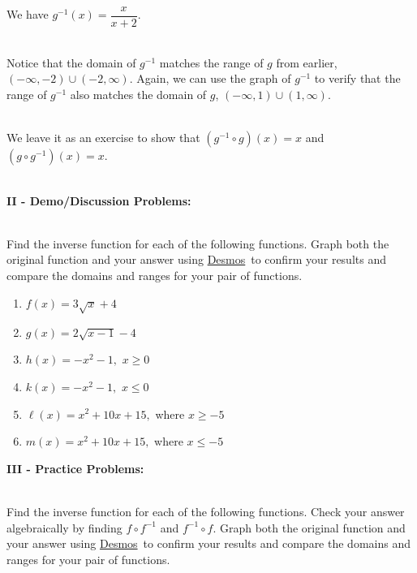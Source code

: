 \documentclass[12pt]{article}
\theoremstyle{definition}
\newcommand{\Desmos}{\href{https://www.desmos.com/}{Desmos}}
\begin{document}
We have $g^{-1}(x) = \dfrac{x}{x+2}$.\\
\ \par
Notice that the domain of $g^{-1}$ matches the range of $g$ from earlier,
$(-\infty,-2) \cup (-2, \infty)$.  Again, we can use the graph of $g^{-1}$ to verify that the range of $g^{-1}$ also matches the domain of $g$, $(-\infty,1) \cup (1, \infty)$.\\
\ \par
We leave it as an exercise to show that $\left(g^{-1} \circ g \right)(x) = x$ and  $\left(g \circ g^{-1} \right)(x) = x$.\\
\ \par
{\bf II - Demo/Discussion Problems:}\\
\ \par
Find the inverse function for each of the following functions. Graph both the original function and your answer using \Desmos \ to confirm your results and compare the domains and ranges for your pair of functions.
\begin{multicols}{2}
\begin{enumerate}
 \item $f(x) = 3\sqrt{x}+4$\\
 \item $g(x)=2\sqrt{x-1}-4$\\
 \item $h(x)=-x^2-1,$ $x\geq 0$
 \item $k(x)=-x^2-1,$ $x\leq 0$\\
 \item $\ell(x) = x^2+10x+15,$ where $x\geq -5$\\
 \item $m(x) = x^2+10x+15,$ where $x\leq -5$
\end{enumerate}
\end{multicols}
\newpage
{\bf III - Practice Problems:}\\
\ \par
Find the inverse function for each of the following functions.  Check your answer algebraically by finding $f\circ f^{-1}$ and $f^{-1}\circ f$.  Graph both the original function and your answer using \Desmos \ to confirm your results and compare the domains and ranges for your pair of functions.
\end{document}
